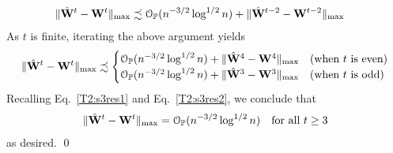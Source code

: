 \documentclass[10pt,journal,compsoc]{IEEEtran}
\newcommand{\op}{\mathcal{O}_{\mathbb{P}}}
\newcommand{\ee}{\end{aligned} \end{equation}}
\newcommand{\W}{\M W}
\newcommand{\HW}{\hat{\M W}}
\newcommand{\bee}{\begin{equation}\begin{aligned}}
\newcommand{\M}[1]{{{\mathbf{\MakeUppercase{#1}}}}}
\numberwithin{equation}{section}
\begin{document}
\bee\label{T23:ite}
&\|\HW^{t} - \W^{t}\|_{\max} 
\precsim \op(n^{-3/2}\log^{1/2}{n}) + \|\hat{\M W}^{t - 2} - \M W^{t - 2}\|_{\max}
\ee
As $t$ is finite, iterating the above argument yields
\bee\nonumber
\|\HW^{t} - \W^{t}\|_{\max} 
\precsim \begin{cases}
\op(n^{-3/2}\log^{1/2}{n}) + \|\hat{\M W}^{4} - \M
W^{4}\|_{\max} &
 \text{(when $t$ is even)} \\
\op(n^{-3/2} \log^{1/2}{n}) + \|\hat{\M W}^3 - \M W^3\|_{\max} 
&
 \text{(when $t$ is odd)}
\end{cases}
\ee
Recalling Eq.~\eqref{T2:s3res1} and Eq.~\eqref{T2:s3res2}, we conclude that
\bee\nonumber
\|\HW^{t} - \W^{t}\|_{\max} = \op(n^{-3/2} \log^{1/2}{n}) \quad \text{for all $t \geq 3$}
\ee
as desired. \qed
\end{document}
